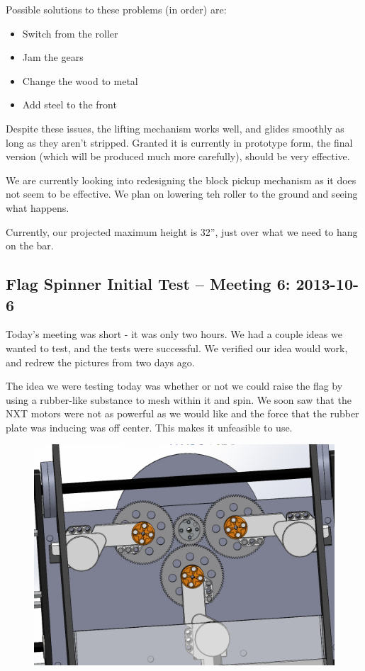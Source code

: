 Possible solutions to these problems (in order) are:
\begin{itemize}
\item Switch from the roller
\item Jam the gears
\item Change the wood to metal
\item Add steel to the front
\end{itemize}

Despite these issues, the lifting mechanism works well, and glides smoothly as long as they aren't stripped. Granted it is currently in prototype form, the final version (which will be produced much more carefully), should be very effective.

We are currently looking into redesigning the block pickup mechanism as it does not seem to be effective. We plan on lowering teh roller to the ground and seeing what happens. 

Currently, our projected maximum height is 32”, just over what we need to hang on the bar.

\newpage \subsection{Flag Spinner Initial Test -- Meeting 6: 2013-10-6}
Today’s meeting was short - it was only two hours. We had a couple ideas we wanted to test, and the tests were successful. We verified our idea would work, and redrew the pictures from two days ago.

The idea we were testing today was whether or not we could raise the flag by using a rubber-like substance to mesh within it and spin. We soon saw that the NXT motors were not as powerful as we would like and the force that the rubber plate was inducing was off center. This makes it unfeasible to use. 

\begin{figure}[H]
\begin{center}
\includegraphics[scale=0.25]{images/FlagSpinnerV1.png}
\end{center}
\end{figure}


